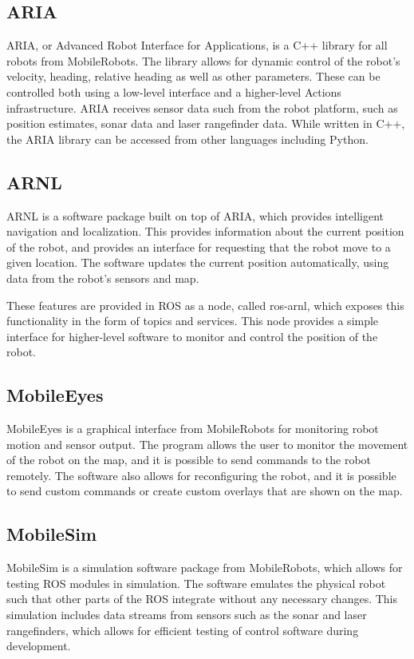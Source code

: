\documentclass[\rootfolder/main.tex]{subfiles}
\begin{document}
\subsection{ARIA}

ARIA, or Advanced Robot Interface for Applications, is a C++ library for all robots from MobileRobots.
The library allows for dynamic control of the robot's velocity, heading, relative heading as well as other parameters.
These can be controlled both using a low-level interface and a higher-level Actions infrastructure.
ARIA receives sensor data such from the robot platform, such as position estimates, sonar data and laser rangefinder data.
While written in C++, the ARIA library can be accessed from other languages including Python.

\subsection{ARNL}

ARNL is a software package built on top of ARIA, which provides intelligent navigation and localization.
This provides information about the current position of the robot, and provides an interface for requesting that the robot move to a given location.
The software updates the current position automatically, using data from the robot's sensors and map.


These features are provided in ROS as a node, called ros-arnl, which exposes this functionality in the form of topics and services.
This node provides a simple interface for higher-level software to monitor and control the position of the robot.

\subsection{MobileEyes}

MobileEyes is a graphical interface from MobileRobots for monitoring robot motion and sensor output.
The program allows the user to monitor the movement of the robot on the map, and it is possible to send commands to the robot remotely.
The software also allows for reconfiguring the robot, and it is possible to send custom commands or create custom overlays that are shown on the map.

\subsection{MobileSim}

MobileSim is a simulation software package from MobileRobots, which allows for testing ROS modules in simulation.
The software emulates the physical robot such that other parts of the ROS integrate without any necessary changes.
This simulation includes data streams from sensors such as the sonar and laser rangefinders, which allows for efficient testing of control software during development.
\end{document}

